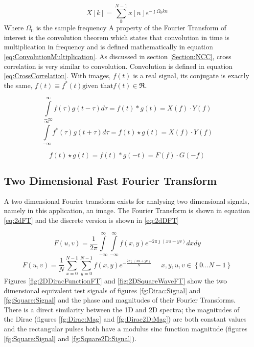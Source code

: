 \begin{equation}\label{eq:DFT}
X[k] = \sum\limits_{0}^{N-1}x[n]e^{-\jmath \Omega_0 kn}
\end{equation}
Where $\Omega_0$ is the sample frequency
A property of the Fourier Transform of interest is the convolution theorem which states that convolution in time is multiplication in frequency and is defined mathematically in equation \eqref{eq:ConvolutionMultiplication}. As discussed in section \ref{Section:NCC}, cross correlation is very similar to convolution. Convolution is defined in equation \eqref{eq:CrossCorrelation}. With images, $f(t)$ is a real signal, its conjugate is exactly the same, $f(t) \equiv f^*(t) \text{given that} f(t) \in \Re$. 


\begin{equation}\label{eq:ConvolutionMultiplication}
\int\limits_{-\infty}^{\infty}f(\tau)g(t-\tau)d\tau = f(t) \ast g(t) = X(f)\cdot Y(f)
\end{equation}
\begin{equation}\label{eq:CrossCorrelation}
\int\limits_{-\infty}^{\infty}f^*(\tau)g(t+\tau)d\tau = f(t) \star g(t) = X(f)\cdot Y(f)
\end{equation}

\begin{equation}\label{eq:CCtoConv}
f(t) \star g(t) = f(t) \ast g(-t) = F(f) \cdot G(-f)
\end{equation}

\subsection{Two Dimensional Fast Fourier Transform}
A two dimensional Fourier transform exists for analysing two dimensional signals, namely in this application, an image. The Fourier Transform is shown in equation \eqref{eq:2dFT} and the discrete version is shown in \eqref{eq:2dDFT}

\begin{equation}\label{eq:2dFT}
F(u,v) = \frac{1}{2\pi}\int\limits_{-\infty}^{\infty}\int\limits_{-\infty}^{\infty}f(x,y)e^{-2\pi\jmath (xu+yv)}dxdy
\end{equation}
\begin{equation}\label{eq:2dDFT}
F(u,v) = \frac{1}{N} \sum\limits_{x=0}^{N-1}\sum\limits_{y=0}^{N-1}f(x,y)e^{-\frac{2\pi\jmath (xu+yv)}{N}} \; \; \; \; \; x,y,u,v \in \left\lbrace 0\dots N-1\right\rbrace
\end{equation}
Figures \ref{fig:2DDiracFunctionFT} and \ref{fig:2DSquareWaveFT} show the two dimensional equivalent test signals of figures \ref{fg:Dirac:Signal} and \ref{fg:Square:Signal} and the phase and magnitudes of their Fourier Transforms. There is a direct similarity between the 1D and 2D spectra; the magnitudes of the Dirac (figures \ref{fg:Dirac:Mag} and \ref{fg:Dirac2D:Mag}) are both constant values and the rectangular pulses both have a modulus sinc function magnitude (figures \ref{fg:Square:Signal} and \ref{fg:Square2D:Signal}). 

